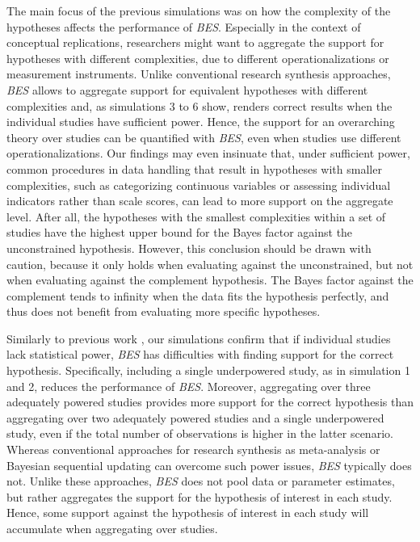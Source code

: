 \documentclass[review, 3p, authoryear]{elsarticle} %
\begin{document}
The main focus of the previous simulations was on how the complexity of the hypotheses affects the performance of \emph{BES}.
Especially in the context of conceptual replications, researchers might want to aggregate the support for hypotheses with different complexities, due to different operationalizations or measurement instruments.
Unlike conventional research synthesis approaches, \emph{BES} allows to aggregate support for equivalent hypotheses with different complexities and, as simulations 3 to 6 show, renders correct results when the individual studies have sufficient power.
Hence, the support for an overarching theory over studies can be quantified with \emph{BES}, even when studies use different operationalizations.
Our findings may even insinuate that, under sufficient power, common procedures in data handling that result in hypotheses with smaller complexities, such as categorizing continuous variables or assessing individual indicators rather than scale scores, can lead to more support on the aggregate level.
After all, the hypotheses with the smallest complexities within a set of studies have the highest upper bound for the Bayes factor against the unconstrained hypothesis.
However, this conclusion should be drawn with caution, because it only holds when evaluating against the unconstrained, but not when evaluating against the complement hypothesis.
The Bayes factor against the complement tends to infinity when the data fits the hypothesis perfectly, and thus does not benefit from evaluating more specific hypotheses.

Similarly to previous work \citep[e.g.,][]{klugkist_volker}, our simulations confirm that if individual studies lack statistical power, \emph{BES} has difficulties with finding support for the correct hypothesis.
Specifically, including a single underpowered study, as in simulation 1 and 2, reduces the performance of \emph{BES}.
Moreover, aggregating over three adequately powered studies provides more support for the correct hypothesis than aggregating over two adequately powered studies and a single underpowered study, even if the total number of observations is higher in the latter scenario.
Whereas conventional approaches for research synthesis as meta-analysis or Bayesian sequential updating can overcome such power issues, \emph{BES} typically does not.
Unlike these approaches, \emph{BES} does not pool data or parameter estimates, but rather aggregates the support for the hypothesis of interest in each study.
Hence, some support against the hypothesis of interest in each study will accumulate when aggregating over studies.
\end{document}
